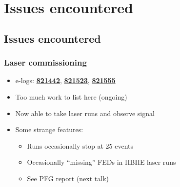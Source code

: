 \documentclass[bigger]{beamer}
\providecommand{\alert}[1]{\textbf{#1}}
\begin{document}
\section{Issues encountered}
\label{sec-2}
\subsection{Issues encountered}
\label{sec-2-1}
\begin{frame}
\frametitle{Laser commissioning}
\label{sec-2-1-1}
\begin{itemize}

\item e-logs: \href{http://cmsonline.cern.ch/cms-elog/821442}{\alert{821442}}, \href{http://cmsonline.cern.ch/cms-elog/821523}{\alert{821523}}, \href{http://cmsonline.cern.ch/cms-elog/821555}{\alert{821555}}
\label{sec-2-1-1-1}%

\item Too much work to list here (ongoing)
\label{sec-2-1-1-2}%

\item Now able to take laser runs and observe signal
\label{sec-2-1-1-3}%

\item Some strange features:
\label{sec-2-1-1-4}%
\begin{itemize}

\item Runs occasionally stop at 25 events
\label{sec-2-1-1-4-1}%

\item Occasionally ``missing'' FEDs in HBHE laser runs
\label{sec-2-1-1-4-2}%

\item See PFG report (next talk)
\label{sec-2-1-1-4-3}%
\end{itemize} %
\end{itemize} %
\end{frame}
\end{document}
